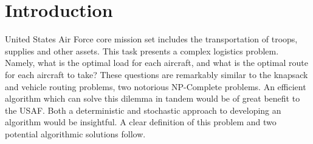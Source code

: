 \documentclass[journal]{IEEEtran}
\begin{document}







\maketitle








%
\IEEEpeerreviewmaketitle



\section{Introduction}
% 
% 
% 
% 
 United States Air Force core mission set includes the transportation of troops, supplies and other assets. This task presents a complex logistics problem. Namely, what is the optimal load for each aircraft, and what is the optimal route for each aircraft to take? These questions are remarkably similar to the knapsack and vehicle routing problems, two notorious NP-Complete problems. An efficient algorithm which can solve this dilemma in tandem would be of great benefit to the USAF. Both a deterministic and stochastic approach to developing an algorithm would be insightful. A clear definition of this problem and two potential algorithmic solutions follow.
\end{document}
